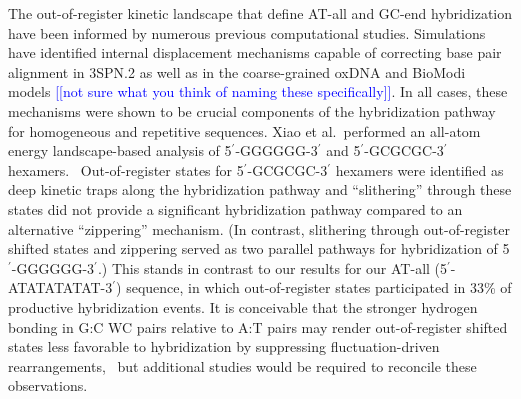 \documentclass[journal=jpcbfk,manuscript=article]{achemso}
\newcommand*{\noteb}[1]{\textcolor{blue}{[[#1]]}}		%
\begin{document}


The out-of-register kinetic landscape that define AT-all and GC-end hybridization have been informed by numerous previous computational studies. Simulations have identified internal displacement mechanisms capable of correcting base pair alignment in 3SPN.2 \citep{Hinckley2014Coarse-grainedEffects} as well as in the coarse-grained oxDNA \citep{Romano2013DNADependence} and BioModi \citep{Markegard2015} models \noteb{not sure what you think of naming these specifically}. In all cases, these mechanisms were shown to be crucial components of the hybridization pathway for homogeneous and repetitive sequences. Xiao et al.\ performed an all-atom energy landscape-based analysis of 5$^\prime$-GGGGGG-3$^\prime$ and 5$^\prime$-GCGCGC-3$^\prime$ hexamers.~\citep{Xiao2019} Out-of-register states for 5$^\prime$-GCGCGC-3$^\prime$ hexamers were identified as deep kinetic traps along the hybridization pathway and ``slithering'' through these states did not provide a significant hybridization pathway compared to an alternative ``zippering'' mechanism. (In contrast, slithering through out-of-register shifted states and zippering served as two parallel pathways for hybridization of 5$^\prime$-GGGGGG-3$^\prime$.) This stands in contrast to our results for our AT-all (5$^\prime$-ATATATATAT-3$^\prime$) sequence, in which out-of-register states participated in 33\% of productive hybridization events. It is conceivable that the stronger hydrogen bonding in G:C WC pairs relative to A:T pairs may render out-of-register shifted states less favorable to hybridization by suppressing fluctuation-driven rearrangements,~\citep{Yakovchuk2006Base-stackingHelix,Zacharias2020Base-PairingFormation} but additional studies would be required to reconcile these observations.
\end{document}
